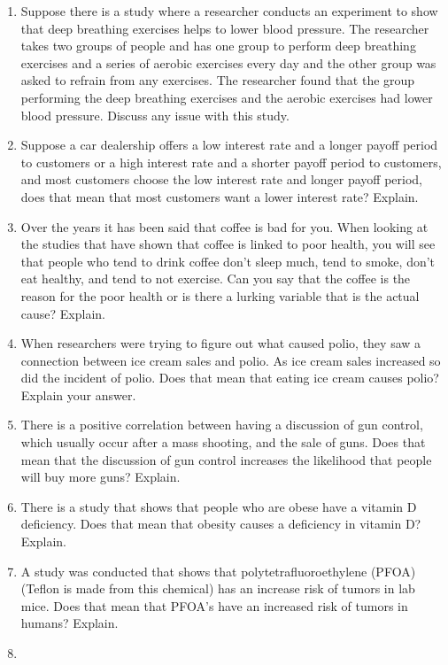 \documentclass[]{book}
\begin{document}
\begin{enumerate}
\def\labelenumi{\arabic{enumi}.}
\item
  Suppose there is a study where a researcher conducts an experiment
  to show that deep breathing exercises helps to lower blood pressure.
  The researcher takes two groups of people and has one group to
  perform deep breathing exercises and a series of aerobic exercises
  every day and the other group was asked to refrain from any
  exercises. The researcher found that the group performing the deep
  breathing exercises and the aerobic exercises had lower blood
  pressure. Discuss any issue with this study.
\item
  Suppose a car dealership offers a low interest rate and a longer
  payoff period to customers or a high interest rate and a shorter
  payoff period to customers, and most customers choose the low
  interest rate and longer payoff period, does that mean that most
  customers want a lower interest rate? Explain.
\item
  Over the years it has been said that coffee is bad for you. When
  looking at the studies that have shown that coffee is linked to poor
  health, you will see that people who tend to drink coffee don't
  sleep much, tend to smoke, don't eat healthy, and tend to not
  exercise. Can you say that the coffee is the reason for the poor
  health or is there a lurking variable that is the actual cause?
  Explain.
\item
  When researchers were trying to figure out what caused polio, they
  saw a connection between ice cream sales and polio. As ice cream
  sales increased so did the incident of polio. Does that mean that
  eating ice cream causes polio? Explain your answer.
\item
  There is a positive correlation between having a discussion of gun
  control, which usually occur after a mass shooting, and the sale of
  guns. Does that mean that the discussion of gun control increases
  the likelihood that people will buy more guns? Explain.
\item
  There is a study that shows that people who are obese have a vitamin
  D deficiency. Does that mean that obesity causes a deficiency in
  vitamin D? Explain.
\item
  A study was conducted that shows that polytetrafluoroethylene (PFOA)
  (Teflon is made from this chemical) has an increase risk of tumors
  in lab mice. Does that mean that PFOA's have an increased risk of
  tumors in humans? Explain.
\item

\end{enumerate}
\end{document}
